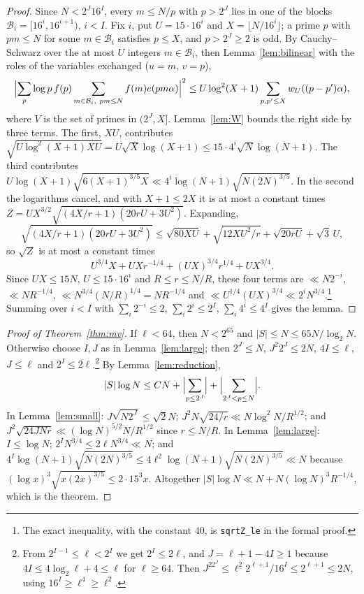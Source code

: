 \documentclass[11pt]{amsart}
\theoremstyle{definition}
\theoremstyle{remark}
\numberwithin{equation}{section}
\newcommand{\e}{e}
\begin{document}
\begin{proof}
Since $N<2^J16^I$, every $m\le N/p$ with $p>2^J$ lies in one of the blocks
$\mathcal B_i=[16^i,16^{i+1})$, $i<I$. Fix $i$, put $U=15\cdot16^i$ and $X=\lfloor
N/16^i\rfloor$; a prime $p$ with $pm\le N$ for some $m\in\mathcal B_i$ satisfies
$p\le X$, and $p>2^J\ge2$ is odd. By Cauchy--Schwarz over the at most $U$
integers $m\in\mathcal B_i$, then Lemma~\ref{lem:bilinear} with the roles of the
variables exchanged ($u=m$, $v=p$),
\[
\Bigl|\sum_p\log p\,f(p)\sum_{m\in\mathcal B_i,\ pm\le N}f(m)\e(pm\alpha)\Bigr|^2\le U\log^2(X+1)\sum_{p,p'\le
X}w_U((p-p')\alpha),
\]
where $V$ is the set of primes in $(2^J,X]$. Lemma~\ref{lem:W} bounds the right
side by three terms. The first, $XU$, contributes
$\sqrt{U\log^2(X+1)XU}=U\sqrt X\log(X+1)\le15\cdot4^i\sqrt N\log(N+1)$. The third
contributes $U\log(X+1)\sqrt{6(X+1)^{3/5}X}\ll4^i\log(N+1)\sqrt{N(2N)^{3/5}}$. In
the second the logarithms cancel, and with $X+1\le2X$ it is at most a constant
times $Z=UX^{3/2}\sqrt{(4X/r+1)(20rU+3U^2)}$. Expanding,
\[
\sqrt{(4X/r+1)(20rU+3U^2)}\le\sqrt{80XU}+\sqrt{12XU^2/r}+\sqrt{20rU}+\sqrt3\,U,
\]
so $\sqrt Z$ is at most a constant times
\[
U^{3/4}X+UXr^{-1/4}+(UX)^{3/4}r^{1/4}+UX^{3/4}.
\]
Since $UX\le15N$, $U\le15\cdot16^i$ and $R\le r\le N/R$, these four terms are
$\ll N2^{-i}$, $\ll N R^{-1/4}$, $\ll N^{3/4}(N/R)^{1/4}=NR^{-1/4}$ and
$\ll U^{1/4}(UX)^{3/4}\ll2^iN^{3/4}$.\footnote{The exact inequality, with the
constant $40$, is \texttt{sqrtZ\_le} in the formal proof.} Summing over $i<I$ with
$\sum_i2^{-i}\le2$, $\sum_i2^i\le2^I$, $\sum_i4^i\le4^I$ gives the lemma.
\end{proof}

\begin{proof}[Proof of Theorem~\textup{\ref{thm:mv}}]
If $\ell<64$, then $N<2^{65}$ and $|S|\le N\le65N/\log_2N$. Otherwise choose
$I,J$ as in Lemma~\ref{lem:large}; then $2^J\le N$, $J^2 2^J\le2N$, $4I\le\ell$,
$J\le\ell$ and $2^I\le2\ell$.\footnote{From $2^{I-1}\le\ell<2^I$ we get
$2^I\le2\ell$, and $J=\ell+1-4I\ge1$ because $4I\le4\log_2\ell+4\le\ell$ for $\ell\ge64$. Then
$J^22^J\le\ell^2 2^{\ell+1}/16^I\le2^{\ell+1}\le2N$, using $16^I\ge\ell^4\ge \ell^2$.} By
Lemma~\ref{lem:reduction},
\[
|S|\log N\le CN+\Bigl|\sum_{p\le2^J}\Bigr|+\Bigl|\sum_{2^J<p\le N}\Bigr| .
\]
In Lemma~\ref{lem:small}: $J\sqrt{N2^J}\le\sqrt2N$; $J^2N\sqrt{24/r}\ll N\log^2N/R^{1/2}$;
and $J^2\sqrt{24JNr}\ll(\log N)^{5/2}N/R^{1/2}$ since $r\le N/R$. In
Lemma~\ref{lem:large}: $I\le\log N$; $2^IN^{3/4}\le2\ell N^{3/4}\ll N$; and
$4^I\log(N+1)\sqrt{N(2N)^{3/5}}\le4\ell^2\log(N+1)\sqrt{N(2N)^{3/5}}\ll N$ because
$(\log x)^3\sqrt{x(2x)^{3/5}}\le2\cdot15^3x$. Altogether
$|S|\log N\ll N+N(\log N)^3R^{-1/4}$, which is the theorem.
\end{proof}
\end{document}

